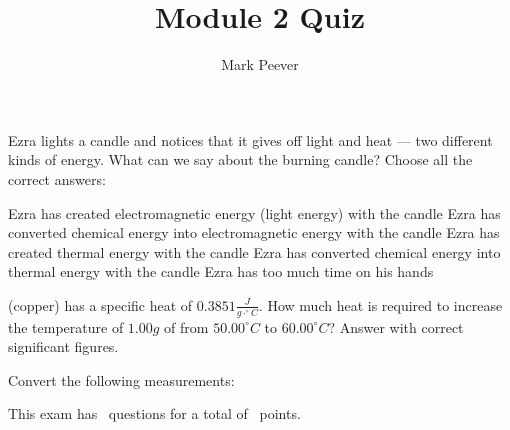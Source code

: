 \documentclass[11pt,addpoints]{exam}   	%
\title{Module 2 Quiz}
\author{Mark Peever}
\begin{document}
\maketitle

\pointsinrightmargin

\begin{center}
\end{center}
\vspace{0.1in}
\vspace{0.2in}

\begin{questions}
\question[5] Ezra lights a candle and notices that it gives off light and heat --- two different kinds of energy.
What can we say about the burning candle? Choose all the correct answers:

\begin{choices}
\choice Ezra has created electromagnetic energy (light energy) with the candle
\choice Ezra has converted chemical energy into electromagnetic energy  with the candle
\choice Ezra has created thermal energy  with the candle
\choice Ezra has converted chemical energy into thermal energy  with the candle
\choice Ezra has too much time on his hands
\end{choices}


\question[5]
 (copper) has a specific heat of $0.3851 \frac{J}{g \cdot ^{\circ}C}$.
How much heat is required to increase the temperature of $1.00g$ of  from $50.00 ^{\circ}C$ to $60.00 ^{\circ}C$? 
Answer with correct significant figures. 



\question
Convert the following measurements:

\end{questions}

\begin{center}
This exam has \numquestions\ questions for a total of \numpoints\ points.
\end{center}
\end{document}
